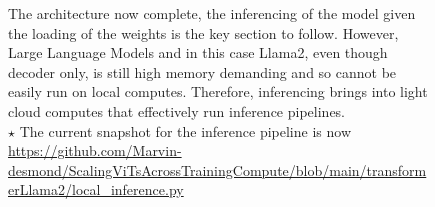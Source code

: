 \documentclass[12pt]{article}
\begin{document}
\begin{figure}[!htb]
\begin{minipage}[t]{0.98\textwidth}
\begin{minipage}{0.65\textwidth}
\begin{lstlisting}[language=python,style=python,basicstyle=\ttfamily\footnotesize]
\end{lstlisting}
\end{minipage}
The architecture now complete, the inferencing of the model given the loading of the weights is 
the key section to follow. However, Large Language Models and in this case Llama2, even though decoder only,
is still high memory demanding and so cannot be easily run on local computes. Therefore, inferencing brings into 
light cloud computes that effectively run inference pipelines.\\
{\footnotesize $\star$ The current snapshot for the inference pipeline is now \url{https://github.com/Marvin-desmond/ScalingViTsAcrossTrainingCompute/blob/main/transformerLlama2/local_inference.py}}
\end{minipage}%
\end{figure}
\pagebreak
\end{document}
